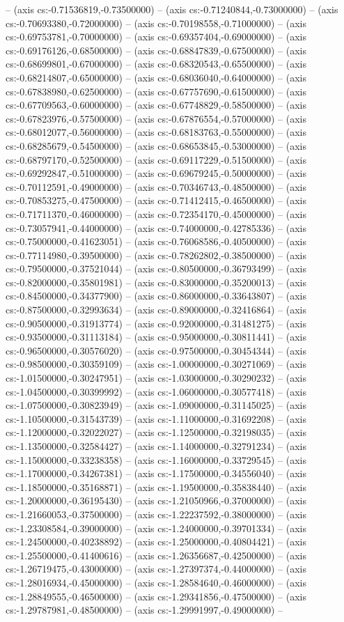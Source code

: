-- (axis cs:-0.71536819,-0.73500000) -- (axis cs:-0.71240844,-0.73000000) -- (axis cs:-0.70693380,-0.72000000) -- (axis cs:-0.70198558,-0.71000000) -- (axis cs:-0.69753781,-0.70000000) -- (axis cs:-0.69357404,-0.69000000) -- (axis cs:-0.69176126,-0.68500000) -- (axis cs:-0.68847839,-0.67500000) -- (axis cs:-0.68699801,-0.67000000) -- (axis cs:-0.68320543,-0.65500000) -- (axis cs:-0.68214807,-0.65000000) -- (axis cs:-0.68036040,-0.64000000) -- (axis cs:-0.67838980,-0.62500000) -- (axis cs:-0.67757690,-0.61500000) -- (axis cs:-0.67709563,-0.60000000) -- (axis cs:-0.67748829,-0.58500000) -- (axis cs:-0.67823976,-0.57500000) -- (axis cs:-0.67876554,-0.57000000) -- (axis cs:-0.68012077,-0.56000000) -- (axis cs:-0.68183763,-0.55000000) -- (axis cs:-0.68285679,-0.54500000) -- (axis cs:-0.68653845,-0.53000000) -- (axis cs:-0.68797170,-0.52500000) -- (axis cs:-0.69117229,-0.51500000) -- (axis cs:-0.69292847,-0.51000000) -- (axis cs:-0.69679245,-0.50000000) -- (axis cs:-0.70112591,-0.49000000) -- (axis cs:-0.70346743,-0.48500000) -- (axis cs:-0.70853275,-0.47500000) -- (axis cs:-0.71412415,-0.46500000) -- (axis cs:-0.71711370,-0.46000000) -- (axis cs:-0.72354170,-0.45000000) -- (axis cs:-0.73057941,-0.44000000) -- (axis cs:-0.74000000,-0.42785336) -- (axis cs:-0.75000000,-0.41623051) -- (axis cs:-0.76068586,-0.40500000) -- (axis cs:-0.77114980,-0.39500000) -- (axis cs:-0.78262802,-0.38500000) -- (axis cs:-0.79500000,-0.37521044) -- (axis cs:-0.80500000,-0.36793499) -- (axis cs:-0.82000000,-0.35801981) -- (axis cs:-0.83000000,-0.35200013) -- (axis cs:-0.84500000,-0.34377900) -- (axis cs:-0.86000000,-0.33643807) -- (axis cs:-0.87500000,-0.32993634) -- (axis cs:-0.89000000,-0.32416864) -- (axis cs:-0.90500000,-0.31913774) -- (axis cs:-0.92000000,-0.31481275) -- (axis cs:-0.93500000,-0.31113184) -- (axis cs:-0.95000000,-0.30811441) -- (axis cs:-0.96500000,-0.30576020) -- (axis cs:-0.97500000,-0.30454344) -- (axis cs:-0.98500000,-0.30359109) -- (axis cs:-1.00000000,-0.30271069) -- (axis cs:-1.01500000,-0.30247951) -- (axis cs:-1.03000000,-0.30290232) -- (axis cs:-1.04500000,-0.30399992) -- (axis cs:-1.06000000,-0.30577418) -- (axis cs:-1.07500000,-0.30823949) -- (axis cs:-1.09000000,-0.31145025) -- (axis cs:-1.10500000,-0.31543739) -- (axis cs:-1.11000000,-0.31692208) -- (axis cs:-1.12000000,-0.32022027) -- (axis cs:-1.12500000,-0.32198035) -- (axis cs:-1.13500000,-0.32584427) -- (axis cs:-1.14000000,-0.32791234) -- (axis cs:-1.15000000,-0.33238358) -- (axis cs:-1.16000000,-0.33729545) -- (axis cs:-1.17000000,-0.34267381) -- (axis cs:-1.17500000,-0.34556040) -- (axis cs:-1.18500000,-0.35168871) -- (axis cs:-1.19500000,-0.35838440) -- (axis cs:-1.20000000,-0.36195430) -- (axis cs:-1.21050966,-0.37000000) -- (axis cs:-1.21660053,-0.37500000) -- (axis cs:-1.22237592,-0.38000000) -- (axis cs:-1.23308584,-0.39000000) -- (axis cs:-1.24000000,-0.39701334) -- (axis cs:-1.24500000,-0.40238892) -- (axis cs:-1.25000000,-0.40804421) -- (axis cs:-1.25500000,-0.41400616) -- (axis cs:-1.26356687,-0.42500000) -- (axis cs:-1.26719475,-0.43000000) -- (axis cs:-1.27397374,-0.44000000) -- (axis cs:-1.28016934,-0.45000000) -- (axis cs:-1.28584640,-0.46000000) -- (axis cs:-1.28849555,-0.46500000) -- (axis cs:-1.29341856,-0.47500000) -- (axis cs:-1.29787981,-0.48500000) -- (axis cs:-1.29991997,-0.49000000) -- 